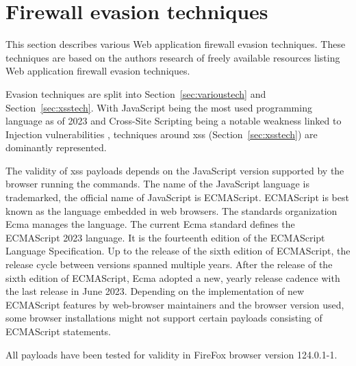 \section{Firewall evasion techniques}
\label{sec:firewallevasiontechniques}

This section describes various Web application firewall evasion techniques. These techniques are based on the authors research of freely available resources listing Web application firewall evasion techniques.

Evasion techniques are split into Section~\ref{sec:varioustech} and Section~\ref{sec:xsstech}. With JavaScript being the most used programming language as of 2023 \cite{statista/mostusedlang} and Cross-Site Scripting being a notable weakness linked to Injection vulnerabilities \cite{OWASP/Injection21}, techniques around \gls{xss} (Section~\ref{sec:xsstech}) are dominantly represented.

The validity of \gls{xss} payloads depends on the JavaScript version supported by the browser running the commands. The name of the JavaScript language is trademarked, the official name of JavaScript is ECMAScript. ECMAScript is best known as the language embedded in web browsers. The standards organization Ecma manages the language. The current Ecma standard defines the ECMAScript 2023 language. It is the fourteenth edition of the ECMAScript Language Specification. Up to the release of the sixth edition of ECMAScript, the release cycle between versions spanned multiple years. After the release of the sixth edition of ECMAScript, Ecma adopted a new, yearly release cadence with the last release in June 2023. \cite{ecma/release,ecma/intro,explorejs/ecmascript}
Depending on the implementation of new ECMAScript features by web-browser maintainers and the browser version used, some browser installations might not support certain payloads consisting of ECMAScript statements. \cite{kangax/compattable}

All payloads have been tested for validity in FireFox browser version 124.0.1-1.

